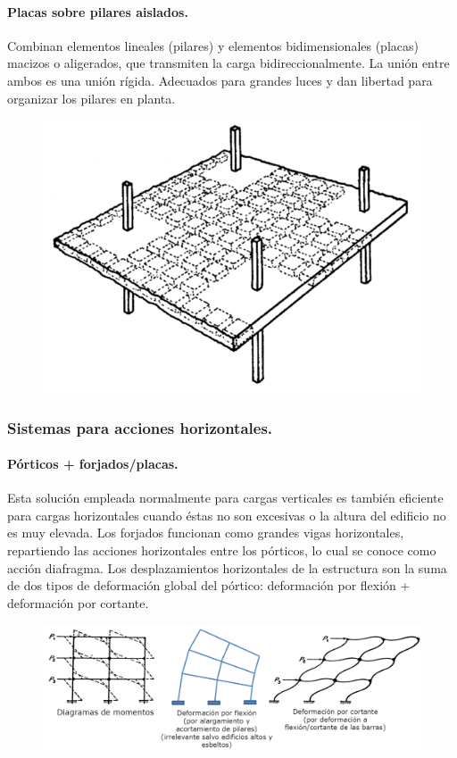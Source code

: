 \paragraph{Placas sobre pilares aislados.}
Combinan elementos lineales (pilares) y elementos bidimensionales (placas) macizos o aligerados, que transmiten la carga bidireccionalmente. La unión entre ambos es una unión rígida. Adecuados para grandes luces y dan libertad para organizar los pilares en planta.

\begin{figure}[H]
    \centering
    \includegraphics[width=0.75\linewidth]{Imagenes/Placas sobre pilares aislados.png}
\end{figure}

\subsubsection{Sistemas para acciones horizontales.}
\paragraph{Pórticos + forjados/placas.}
Esta solución empleada normalmente para cargas verticales es también eficiente para cargas horizontales cuando éstas no son excesivas o la altura del edificio no es muy elevada. Los forjados funcionan como grandes vigas horizontales, repartiendo las acciones horizontales entre los pórticos, lo cual se conoce como acción diafragma. Los desplazamientos horizontales de la estructura son la suma de dos tipos de deformación global del pórtico: deformación por flexión + deformación por cortante.

\begin{figure}[H]
    \centering
    \includegraphics[width=1\linewidth]{Imagenes/Porticos + forjados.png}
\end{figure}

